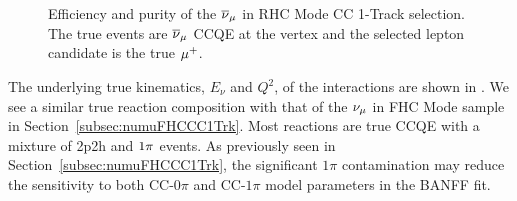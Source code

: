 \begin{figure}
\begin{centering}
\par\end{centering}
\caption[Efficiency and Purity of the $\numubar$ in RHC Mode CC 1-Track Selection]{Efficiency and purity of the $\protect\overline{\nu}_{\mu}$ in RHC Mode CC 1-Track
selection. The true events are $\protect\overline{\nu}_{\mu}$ CCQE at the vertex
and the selected lepton candidate is the true $\protect\mu^{+}$.\label{fig:numubarRHCCC1TrkRecoEffPur}}
\end{figure}

The underlying true kinematics, $E_{\nu}$ and $Q^{2}$, of the interactions
are shown in . We see a similar
true reaction composition with that of the $\nu_{\mu}$ in FHC Mode sample
in \mbox{Section~\ref{subsec:numuFHCCC1Trk}}. Most reactions are
true CCQE with a mixture of 2p2h and $1\pi$ events. As previously
seen in \mbox{Section~\ref{subsec:numuFHCCC1Trk}}, the significant
$1\pi$ contamination may reduce the sensitivity to both CC-$0\pi$
and CC-$1\pi$ model parameters in the BANFF fit.

